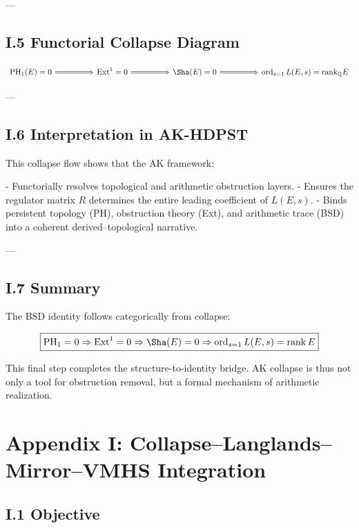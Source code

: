 ---

\subsection*{I.5 Functorial Collapse Diagram}

\[
\begin{tikzcd}[row sep=large, column sep=huge]
\mathrm{PH}_1(E) = 0 \arrow[r, Rightarrow] & 
\mathrm{Ext}^1 = 0 \arrow[r, Rightarrow] & 
\Sha(E) = 0 \arrow[r, Rightarrow] & 
\operatorname{ord}_{s=1} L(E,s) = \mathrm{rank}_\mathbb{Q} E
\end{tikzcd}
\]

---

\subsection*{I.6 Interpretation in AK-HDPST}

This collapse flow shows that the AK framework:

- Functorially resolves topological and arithmetic obstruction layers.
- Ensures the regulator matrix \( R \) determines the entire leading coefficient of \( L(E,s) \).
- Binds persistent topology (PH), obstruction theory (Ext), and arithmetic trace (BSD) into a coherent derived–topological narrative.

---

\subsection*{I.7 Summary}

The BSD identity follows categorically from collapse:

\[
\boxed{
\mathrm{PH}_1 = 0 \Rightarrow \mathrm{Ext}^1 = 0 \Rightarrow \Sha(E) = 0 \Rightarrow \operatorname{ord}_{s=1} L(E,s) = \operatorname{rank} E
}
\]

This final step completes the structure-to-identity bridge.  
AK collapse is thus not only a tool for obstruction removal,  
but a formal mechanism of arithmetic realization.



\section*{Appendix I: Collapse–Langlands–Mirror–VMHS Integration}

\subsection*{I.1 Objective}


